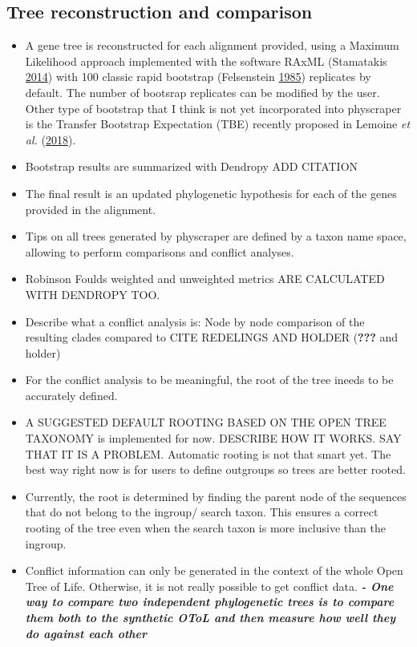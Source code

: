 \documentclass[]{article}
\providecommand{\tightlist}{%
  \setlength{\itemsep}{0pt}\setlength{\parskip}{0pt}}
\begin{document}
\hypertarget{tree-reconstruction-and-comparison}{%
\subsection{Tree reconstruction and comparison}\label{tree-reconstruction-and-comparison}}

\begin{itemize}
\tightlist
\item
  A gene tree is reconstructed for each alignment provided, using a Maximum Likelihood approach implemented with the software RAxML (Stamatakis \protect\hyperlink{ref-stamatakis2014raxml}{2014})
  with 100 classic rapid bootstrap (Felsenstein \protect\hyperlink{ref-felsenstein1985confidence}{1985}) replicates by default. The number of bootsrap replicates can be modified by the user.
  Other type of bootstrap that I think is not yet incorporated into physcraper is the Transfer Bootstrap Expectation (TBE) recently proposed in Lemoine \emph{et al.} (\protect\hyperlink{ref-lemoine2018renewing}{2018}).
\item
  Bootstrap results are summarized with Dendropy ADD CITATION
\item
  The final result is an updated phylogenetic hypothesis for each of the genes provided in the alignment.
\item
  Tips on all trees generated by physcraper are defined by a taxon name space, allowing to perform comparisons and conflict analyses.
\item
  Robinson Foulds weighted and unweighted metrics ARE CALCULATED WITH DENDROPY TOO.
\item
  Describe what a conflict analysis is: Node by node comparison of the resulting clades compared to CITE REDELINGS AND HOLDER ({\textbf{???}} and holder)
\item
  For the conflict analysis to be meaningful, the root of the tree ineeds to be accurately defined.
\item
  A SUGGESTED DEFAULT ROOTING BASED ON THE OPEN TREE TAXONOMY is implemented for now. DESCRIBE HOW IT WORKS. SAY THAT IT IS A PROBLEM. Automatic rooting is not that smart yet. The best way right now is for users to define outgroups so trees are better rooted.
\item
  Currently, the root is determined by finding the parent node of the sequences that do not belong to the ingroup/ search taxon. This ensures a correct rooting of the tree even when the search taxon is more inclusive than the ingroup.
\item
  Conflict information can only be generated in the context of the whole Open Tree of
  Life. Otherwise, it is not really possible to get conflict data.
  \textbf{\emph{- One way to compare two independent phylogenetic trees is to compare them both to
  the synthetic OToL and then measure how well they do against each other}}
\end{itemize}
\end{document}

